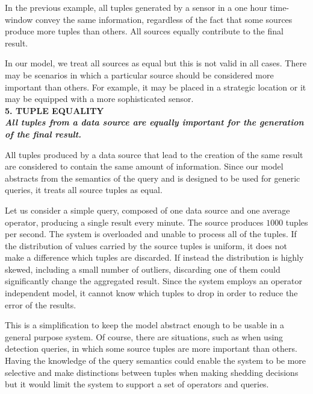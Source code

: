 	In the previous example, all tuples generated by a sensor in a one hour time-window convey the same
	information, regardless of the fact that some sources produce more tuples than others. All
	sources equally contribute to the final result.

	In our model, we treat all sources as equal but this is not valid in all cases. There may
	be scenarios in which a particular source should be considered more important than others. For
	example, it may be placed in a strategic location or it may be equipped with a more
	sophisticated sensor. \\

\textbf{5. TUPLE EQUALITY \\ \textit{All tuples from a data source are equally important for the generation
of the final result.}}

	All tuples produced by a data source that lead to the creation of the same result are considered to contain
	the same amount of information. Since our model abstracts from the semantics of the query and is
	designed to be used for generic queries, it treats all source tuples as equal. 

Let us consider a simple query, composed of one data source and one average operator, producing a single
result every minute. The source produces $1000$ tuples per second. The system is overloaded and unable
to process all of the tuples. If the distribution of values carried by the source tuples is uniform, it
does not make a difference which tuples are discarded. If instead the distribution is highly skewed,
including a small number of outliers, discarding one of them could significantly change the aggregated
result. Since the system employs an operator independent model, it cannot know which tuples to drop in
order to reduce the error of the results. 

This is a simplification to keep the model abstract enough to be usable in a general purpose system. Of
course, there are situations, such as when using detection queries, in which some source tuples are more
important than others. Having the knowledge of the query semantics could enable the system to be more
selective and make distinctions between tuples when making shedding decisions but it would limit the
system to support a set of operators and queries.

